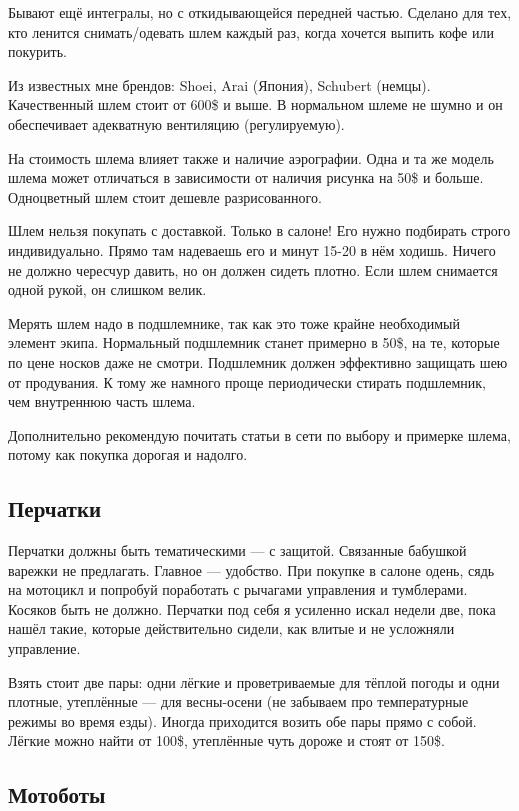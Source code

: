 \documentclass[12pt,a4paper]{article}
\begin{document}
Бывают ещё интегралы, но с откидывающейся передней частью. Сделано для
тех, кто ленится снимать/одевать шлем каждый раз, когда хочется выпить
кофе или покурить.

Из известных мне брендов: Shoei, Arai (Япония), Schubert (немцы).
Качественный шлем стоит от 600\$ и выше. В нормальном шлеме не шумно и
он обеспечивает адекватную вентиляцию (регулируемую).

На стоимость шлема влияет также и наличие аэрографии. Одна и та же
модель шлема может отличаться в зависимости от наличия рисунка на 50\$
и больше. Одноцветный шлем стоит дешевле разрисованного.

Шлем нельзя покупать с доставкой. Только в салоне! Его нужно подбирать
строго индивидуально. Прямо там надеваешь его и минут 15-20 в нём
ходишь. Ничего не должно чересчур давить, но он должен сидеть плотно.
Если шлем снимается одной рукой, он слишком велик.

Мерять шлем надо в подшлемнике, так как это тоже крайне необходимый
элемент экипа. Нормальный подшлемник станет примерно в 50\$, на те,
которые по цене носков даже не смотри. Подшлемник должен эффективно
защищать шею от продувания. К тому же намного проще периодически
стирать подшлемник, чем внутреннюю часть шлема.

Дополнительно рекомендую почитать статьи в сети по выбору и примерке
шлема, потому как покупка дорогая и надолго.

\subsection{Перчатки}

Перчатки должны быть тематическими --- с защитой. Связанные бабушкой
варежки не предлагать. Главное --- удобство. При покупке в салоне одень,
сядь на мотоцикл и попробуй поработать с рычагами управления и
тумблерами. Косяков быть не должно. Перчатки под себя я усиленно искал
недели две, пока нашёл такие, которые действительно сидели, как влитые
и не усложняли управление.

Взять стоит две пары: одни лёгкие и проветриваемые для тёплой погоды и
одни плотные, утеплённые --- для весны-осени (не забываем про
температурные режимы во время езды). Иногда приходится возить обе пары
прямо с собой. Лёгкие можно найти от 100\$, утеплённые чуть дороже и
стоят от 150\$.

\subsection{Мотоботы}
\end{document}
